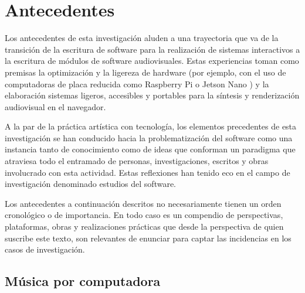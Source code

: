 
\chapter{Antecedentes}



Los antecedentes de esta investigación aluden a una trayectoria que va de la transición de la escritura de software para la realización de sistemas interactivos a la escritura de módulos de software audiovisuales. Estas experiencias toman como premisas la optimización y la ligereza de hardware (por ejemplo, con el uso de computadoras de placa reducida como Raspberry Pi o Jetson Nano ) y la elaboración sistemas ligeros, accesibles y portables para la síntesis y renderización audiovisual en el navegador.

A la par de la práctica artística con tecnología, los elementos precedentes de esta investigación se han conducido hacia la problematización del software como una instancia tanto de conocimiento como de ideas que conforman un paradigma que atraviesa todo el entramado de personas, investigaciones, escritos y obras involucrado con esta actividad. Estas reflexiones han tenido eco en el campo de investigación denominado estudios del software.

Los antecedentes a continuación descritos no necesariamente tienen un orden cronológico o de importancia. En todo caso es un compendio de perspectivas, plataformas, obras y realizaciones prácticas que desde la perspectiva de quien suscribe este texto, son relevantes de enunciar para captar las incidencias en los casos de investigación. 

\section{Música por computadora}



